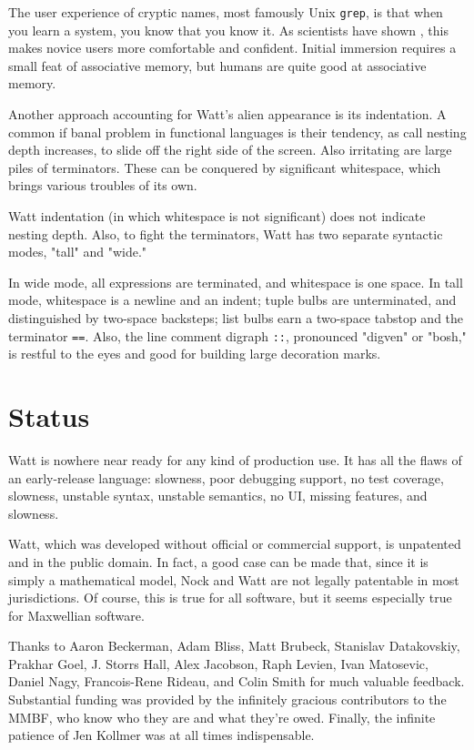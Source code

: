\documentclass[10pt, nocopyrightspace]{sigplanconf}
\begin{document}
The user experience of cryptic names, most famously Unix
\verb|grep|, is that when you learn a system, you know that you
know it.  As scientists have shown \citep{unixtrouble},
this makes novice users more comfortable and confident.  Initial
immersion requires a small feat of associative memory, but humans
are quite good at associative memory.

Another approach accounting for Watt's alien appearance is its
indentation.  A common if banal problem in functional languages
is their tendency, as call nesting depth increases, to slide off
the right side of the screen.  Also irritating are large piles of
terminators.  These can be conquered by significant whitespace,
which brings various troubles of its own.

Watt indentation (in which whitespace is not significant) does
not indicate nesting depth.  Also, to fight the terminators, Watt
has two separate syntactic modes, "tall" and "wide."  

In wide
mode, all expressions are terminated, and whitespace is one
space.  In tall mode, whitespace is a newline and an indent;
tuple bulbs are unterminated, and distinguished by two-space
backsteps; list bulbs earn a two-space tabstop and the terminator
\verb|==|.  Also, the line comment digraph \verb|::|, pronounced
"digven" or "bosh," is restful to the eyes and good for building
large decoration marks.

\section{Status}

Watt is nowhere near ready for any kind of production use.  It
has all the flaws of an early-release language: slowness, poor
debugging support, no test coverage, slowness, unstable syntax,
unstable semantics, no UI, missing features, and slowness.

Watt, which was developed without official or commercial support,
is unpatented and in the public domain.  In fact, a good case can
be made that, since it is simply a mathematical model, Nock and
Watt are not legally patentable in most jurisdictions.  Of
course, this is true for all software, but it seems especially
true for Maxwellian software.

\acks

Thanks to Aaron Beckerman, Adam Bliss, Matt Brubeck, Stanislav
Datakovskiy, Prakhar Goel, J. Storrs Hall, Alex Jacobson, Raph
Levien, Ivan Matosevic, Daniel Nagy, Francois-Rene Rideau, and
Colin Smith for much valuable feedback.  Substantial funding was
provided by the infinitely gracious contributors to the MMBF, who
know who they are and what they're owed.  Finally, the infinite
patience of Jen Kollmer was at all times indispensable.






\end{document}
